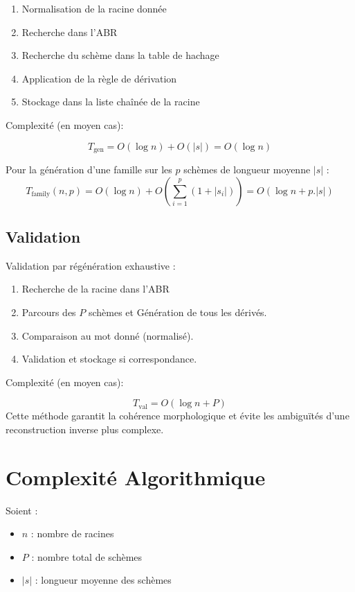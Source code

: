 \documentclass[11pt,a4paper]{article}
\begin{document}
\begin{enumerate}[nosep]
\item Normalisation de la racine donnée
\item Recherche dans l’ABR
\item Recherche du schème dans la table de hachage
\item Application de la règle de dérivation
\item Stockage dans la liste chaînée de la racine
\end{enumerate}

Complexité (en moyen cas):

\[
T_{\text{gen}} = O(\log n) + O(|s|) = O(\log n)
\]

Pour la génération d'une famille sur les $p$ schèmes de longueur moyenne $|s|$ :
\[
T_{\text{family}}(n, p) = O(\log n) + O\!\left(\sum_{i=1}^{p}(1 + \lvert s_i\rvert)\right) = O(\log n + p .|s|)
\]

\subsection{Validation}

Validation par régénération exhaustive :

\begin{enumerate}[nosep]
\item Recherche de la racine dans l’ABR
\item Parcours des $P$ schèmes et Génération de tous les dérivés.
\item Comparaison au mot donné (normalisé).
\item Validation et stockage si correspondance.
\end{enumerate}

Complexité (en moyen cas):

\[
T_{\text{val}} = O(\log n + P)
\]
Cette méthode garantit la cohérence morphologique et évite les ambiguïtés d’une reconstruction inverse plus complexe.

\section{Complexité Algorithmique}

Soient :
\begin{itemize}[nosep]
\item $n$ : nombre de racines
\item $P$ : nombre total de schèmes
\item $|s|$ : longueur moyenne des schèmes
\end{itemize}
\end{document}
